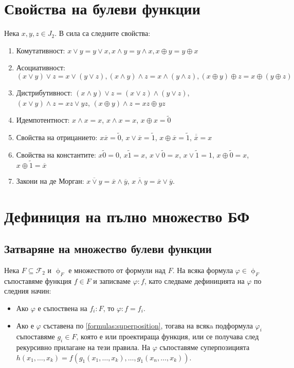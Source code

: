 \documentclass[fleqn,12pt]{article}
\begin{document}
\begin{flushleft}
\section{Свойства на булеви функции}

Нека $x,y,z \in J_2$. В сила са следните свойства:
\begin{enumerate}
    \item Комутативност: $x \vee y = y \vee x, x \wedge y = y \wedge x, x \oplus y = y \oplus x$
    \item Асоциативност: $(x \vee y) \vee z = x \vee (y \vee z), (x \wedge y) \wedge z = x \wedge (y \wedge z), (x \oplus y) \oplus z = x \oplus (y \oplus z)$
    \item Дистрибутивност: $(x \wedge y) \vee z = (x \vee z) \wedge (y \vee z)$, $(x \vee y) \wedge z = xz \vee yz$, $(x \oplus y) \wedge z = xz \oplus yz$
    \item Идемпотентност: $x \wedge x = x$, $x \wedge x = x$, $x \oplus x = \widetilde{0}$
    \item Свойства на отрицанието: $x\overline{x} = \widetilde{0}$, $x \vee \overline{x} = \widetilde{1}$, $x \oplus \overline{x} = \widetilde{1}$, $\overline{\overline{{x}}} = x$
    \item Свойства на константите: $x\widetilde{0} = 0$, $x\widetilde{1} = x$, $x\vee \widetilde{0} = x$, $x \vee \widetilde{1} = 1$, $x \oplus \widetilde{0} = x$, $x \oplus \widetilde{1} = \overline{x}$
    \item Закони на де Морган: $\overline{x \vee y} = \overline{x} \wedge \overline{y}$, $\overline{x \wedge y} = \overline{x} \vee \overline{y}$.  
\end{enumerate}


\section{Дефиниция на пълно множество БФ}
\subsection{Затваряне на множество булеви функции}
Нека $F \subseteq \mathcal{F}_2$ и $\upphi_F$ е множеството от формули над $F$.
На всяка формула $\varphi \in \upphi_F$ съпоставяме функция $f \in F$ и записваме $\varphi : f$, като 
следваме дефиницията на $\varphi$ по следния начин:
\begin{itemize}
    \item Ако $\varphi$ е съпоствена на $f_i : F$, то $\varphi : f = f_i$.
    \item Ако е $\varphi$ съставена по \ref{formulas:superposition}, тогава на всякa подформула $\varphi_i$ съпоставяме $g_i \in F$, 
    която е или проектираща функция, или се получава след рекурсивно прилагане на тези правила. На $\varphi$ съпоставяме 
    суперпозицията $h(x_1, \dots, x_k) = f(g_1(x_1, \dots, x_k), \dots, g_1(x_n, \dots, x_k))$.
\end{itemize}


\end{flushleft}
\end{document}
